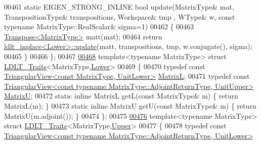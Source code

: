 \begin{DoxyCode}
00461   \textcolor{keyword}{static} EIGEN\_STRONG\_INLINE \textcolor{keywordtype}{bool} update(MatrixType& mat, TranspositionType& transpositions, Workspace& tmp
      , WType& w, \textcolor{keyword}{const} \textcolor{keyword}{typename} MatrixType::RealScalar& sigma=1)
00462   \{
00463     \hyperlink{group___core___module_class_eigen_1_1_transpose}{Transpose<MatrixType>} matt(mat);
00464     \textcolor{keywordflow}{return} \hyperlink{struct_eigen_1_1internal_1_1ldlt__inplace}{ldlt\_inplace<Lower>::update}(matt, transpositions, tmp, w.conjugate(),
       sigma);
00465   \}
00466 \};
00467 
\hyperlink{struct_eigen_1_1internal_1_1_l_d_l_t___traits_3_01_matrix_type_00_01_lower_01_4}{00468} \textcolor{keyword}{template}<\textcolor{keyword}{typename} MatrixType> \textcolor{keyword}{struct }\hyperlink{struct_eigen_1_1internal_1_1_l_d_l_t___traits}{LDLT\_Traits}<MatrixType,\hyperlink{group__enums_gga39e3366ff5554d731e7dc8bb642f83cda891792b8ed394f7607ab16dd716f60e6}{Lower}>
00469 \{
00470   \textcolor{keyword}{typedef} \textcolor{keyword}{const} \hyperlink{group___core___module_class_eigen_1_1_triangular_view}{TriangularView<const MatrixType, UnitLower>} 
      \hyperlink{group___core___module_class_eigen_1_1_triangular_view}{MatrixL};
00471   \textcolor{keyword}{typedef} \textcolor{keyword}{const} 
      \hyperlink{group___core___module_class_eigen_1_1_triangular_view}{TriangularView<const typename MatrixType::AdjointReturnType, UnitUpper>}
       \hyperlink{group___core___module_class_eigen_1_1_triangular_view}{MatrixU};
00472   \textcolor{keyword}{static} \textcolor{keyword}{inline} MatrixL getL(\textcolor{keyword}{const} MatrixType& m) \{ \textcolor{keywordflow}{return} MatrixL(m); \}
00473   \textcolor{keyword}{static} \textcolor{keyword}{inline} MatrixU getU(\textcolor{keyword}{const} MatrixType& m) \{ \textcolor{keywordflow}{return} MatrixU(m.adjoint()); \}
00474 \};
00475 
\hyperlink{struct_eigen_1_1internal_1_1_l_d_l_t___traits_3_01_matrix_type_00_01_upper_01_4}{00476} \textcolor{keyword}{template}<\textcolor{keyword}{typename} MatrixType> \textcolor{keyword}{struct }\hyperlink{struct_eigen_1_1internal_1_1_l_d_l_t___traits}{LDLT\_Traits}<MatrixType,\hyperlink{group__enums_gga39e3366ff5554d731e7dc8bb642f83cda6bcb58be3b8b8ec84859ce0c5ac0aaec}{Upper}>
00477 \{
00478   \textcolor{keyword}{typedef} \textcolor{keyword}{const} 
      \hyperlink{group___core___module_class_eigen_1_1_triangular_view}{TriangularView<const typename MatrixType::AdjointReturnType, UnitLower>}

\end{DoxyCode}
